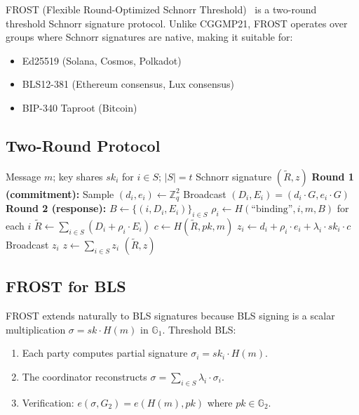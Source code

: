 \documentclass[11pt,a4paper]{article}
\begin{document}
FROST (Flexible Round-Optimized Schnorr Threshold)~\cite{komlo2020frost} is a
two-round threshold Schnorr signature protocol. Unlike CGGMP21, FROST operates
over groups where Schnorr signatures are native, making it suitable for:

\begin{itemize}[leftmargin=2em]
  \item Ed25519 (Solana, Cosmos, Polkadot)
  \item BLS12-381 (Ethereum consensus, Lux consensus)
  \item BIP-340 Taproot (Bitcoin)
\end{itemize}

\subsection{Two-Round Protocol}

\begin{algorithm}[ht]
\caption{FROST Signing.}
\label{alg:frost}
\begin{algorithmic}[1]
\Require Message $m$; key shares $sk_i$ for $i \in S$; $|S| = t$
\Ensure Schnorr signature $(\tilde{R}, z)$
\State \textbf{Round 1 (commitment):}
  \State Sample $(d_i, e_i) \leftarrow \mathbb{Z}_q^2$
  \State Broadcast $(D_i, E_i) = (d_i \cdot G, e_i \cdot G)$
\EndFor
\State \textbf{Round 2 (response):}
\State $B \leftarrow \{(i, D_i, E_i)\}_{i \in S}$
\State $\rho_i \leftarrow H(\text{``binding''}, i, m, B)$ for each $i$
\State $\tilde{R} \leftarrow \sum_{i \in S} (D_i + \rho_i \cdot E_i)$
\State $c \leftarrow H(\tilde{R}, pk, m)$ 
  \State $z_i \leftarrow d_i + \rho_i \cdot e_i + \lambda_i \cdot sk_i \cdot c$
  \State Broadcast $z_i$
\EndFor
\State $z \leftarrow \sum_{i \in S} z_i$
\State \Return $(\tilde{R}, z)$
\end{algorithmic}
\end{algorithm}

\subsection{FROST for BLS}

FROST extends naturally to BLS signatures because BLS signing is a scalar
multiplication $\sigma = sk \cdot H(m)$ in $\mathbb{G}_1$. Threshold BLS:

\begin{enumerate}[leftmargin=2em]
  \item Each party computes partial signature $\sigma_i = sk_i \cdot H(m)$.
  \item The coordinator reconstructs $\sigma = \sum_{i \in S} \lambda_i \cdot \sigma_i$.
  \item Verification: $e(\sigma, G_2) = e(H(m), pk)$ where $pk \in \mathbb{G}_2$.
\end{enumerate}
\end{document}
